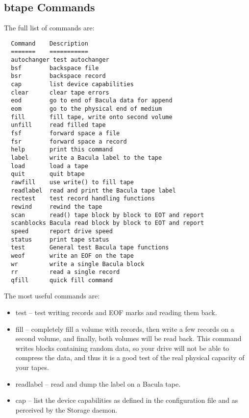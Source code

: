 \subsection{btape Commands}

The full list of commands are: 

\footnotesize
\begin{verbatim}
  Command    Description
  =======    ===========
  autochanger test autochanger
  bsf        backspace file
  bsr        backspace record
  cap        list device capabilities
  clear      clear tape errors
  eod        go to end of Bacula data for append
  eom        go to the physical end of medium
  fill       fill tape, write onto second volume
  unfill     read filled tape
  fsf        forward space a file
  fsr        forward space a record
  help       print this command
  label      write a Bacula label to the tape
  load       load a tape
  quit       quit btape
  rawfill    use write() to fill tape
  readlabel  read and print the Bacula tape label
  rectest    test record handling functions
  rewind     rewind the tape
  scan       read() tape block by block to EOT and report
  scanblocks Bacula read block by block to EOT and report
  speed      report drive speed
  status     print tape status
  test       General test Bacula tape functions
  weof       write an EOF on the tape
  wr         write a single Bacula block
  rr         read a single record
  qfill      quick fill command
\end{verbatim}
\normalsize

The most useful commands are: 

\begin{itemize}
\item test -- test writing records and EOF marks and  reading them back.  
\item fill -- completely fill a volume with records, then  write a few records
   on a second volume, and finally,  both volumes will be read back. 
   This command writes blocks containing random data, so your drive will
   not be able to compress the data, and thus it is a good test of 
   the real physical capacity of your tapes.              
\item readlabel -- read and dump the label on a Bacula tape.  
\item cap -- list the device capabilities as defined in the  configuration
   file and as perceived by the Storage daemon. 
   \end{itemize}

